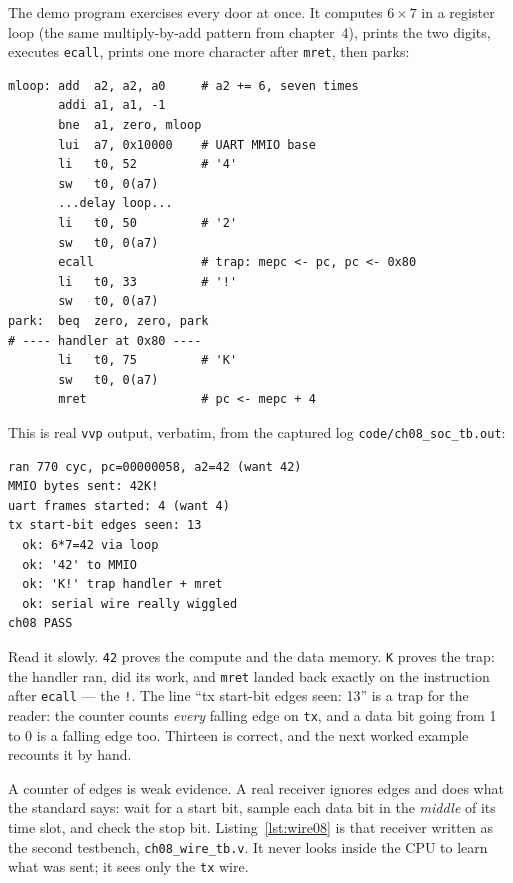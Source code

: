 The demo program exercises every door at once. It computes
\(6\times 7\) in a register loop (the same multiply-by-add pattern
from chapter~4), prints the two digits, executes \texttt{ecall},
prints one more character after \texttt{mret}, then parks:

\begin{lstlisting}[language={[x86masm]Assembler},caption={The demo
program (assembled by the book's own assembler into
\texttt{ch08\_prog.hex}). Excerpt --- main loop, UART writes,
\texttt{ecall}, and the handler at 0x80.}]
mloop: add  a2, a2, a0     # a2 += 6, seven times
       addi a1, a1, -1
       bne  a1, zero, mloop
       lui  a7, 0x10000    # UART MMIO base
       li   t0, 52         # '4'
       sw   t0, 0(a7)
       ...delay loop...
       li   t0, 50         # '2'
       sw   t0, 0(a7)
       ecall               # trap: mepc <- pc, pc <- 0x80
       li   t0, 33         # '!'
       sw   t0, 0(a7)
park:  beq  zero, zero, park
# ---- handler at 0x80 ----
       li   t0, 75         # 'K'
       sw   t0, 0(a7)
       mret                # pc <- mepc + 4
\end{lstlisting}

\begin{example}
This is real \texttt{vvp} output, verbatim, from the captured
log \texttt{code/ch08\_soc\_tb.out}:

\begin{verbatim}
ran 770 cyc, pc=00000058, a2=42 (want 42)
MMIO bytes sent: 42K!
uart frames started: 4 (want 4)
tx start-bit edges seen: 13
  ok: 6*7=42 via loop
  ok: '42' to MMIO
  ok: 'K!' trap handler + mret
  ok: serial wire really wiggled
ch08 PASS
\end{verbatim}

Read it slowly. \texttt{42} proves the compute and the data memory.
\texttt{K} proves the trap: the handler ran, did its work, and
\texttt{mret} landed back exactly on the instruction after
\texttt{ecall} --- the \texttt{!}. The line ``tx start-bit edges seen: 13'' is
a trap for the reader: the counter counts \emph{every} falling edge on
\texttt{tx}, and a data bit going from 1 to 0 is a falling edge too.
Thirteen is correct, and the next worked example recounts it by hand.
\end{example}

A counter of edges is weak evidence. A real receiver ignores edges
and does what the standard says: wait for a start bit, sample each
data bit in the \emph{middle} of its time slot, and check the stop
bit. Listing~\ref{lst:wire08} is that receiver written as the second
testbench, \texttt{ch08\_wire\_tb.v}. It never looks inside the CPU to
learn what was sent; it sees only the \texttt{tx} wire.

